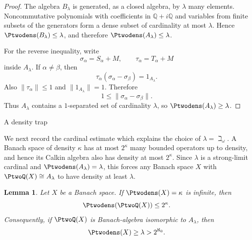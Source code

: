 \documentclass[11pt,reqno]{amsart}
\makeatletter
\theoremstyle{plain}
\newtheorem{lemma}[lemma]{Lemma}
\theoremstyle{definition}
\newcounter{problempaper}
\newenvironment{problempaperbody}{%
  \setcounter{subsection}{0}%
  \setcounter{subsubsection}{0}%
  \setcounter{paragraph}{0}%
  \renewcommand{\thesubsection}{\arabic{subsection}}%
  \renewcommand{\thesubsubsection}{\thesubsection.\arabic{subsubsection}}%
  \renewcommand{\theparagraph}{\thesubsubsection.\arabic{paragraph}}%
  \let\problem@outersection\section
  \let\problem@outersubsection\subsection
  \let\problem@outersubsubsection\subsubsection
  \let\problem@outerparagraph\paragraph
  \let\section\problem@papersection
  \let\subsection\problem@papersubsection
  \let\subsubsection\problem@papersubsubsection
}{%
  \let\section\problem@outersection
  \let\subsection\problem@outersubsection
  \let\subsubsection\problem@outersubsubsection
  \let\paragraph\problem@outerparagraph
}
\newcommand{\problem@target}[2]{%
  \hypertarget{problem-\theproblempaper-#1-#2}{}%
}
\newcommand{\problem@paperheading}[3]{%
  \par\bigskip
  \problem@target{#1}{#2}%
  \noindent{\large\bfseries #2.\quad #3\par}%
  \nobreak\smallskip
}
\newcommand{\problem@papersubheading}[3]{%
  \par\medskip
  \problem@target{#1}{#2}%
  \noindent{\normalsize\bfseries #2.\quad #3\par}%
  \nobreak\smallskip
}
\newcommand{\problem@papersubsubheading}[3]{%
  \par\smallskip
  \problem@target{#1}{#2}%
  \noindent{\normalsize\itshape #2.\quad #3.\ }%
}
\def\problem@papersection{%
  \@ifstar{\problem@papersectionstar}{\problem@papersectionnostar}%
}
\def\problem@papersectionstar#1{%
  \par\bigskip\noindent{\large\bfseries #1\par}\nobreak\smallskip
}
\def\problem@papersectionnostar#1{%
  \refstepcounter{subsection}%
  \setcounter{subsubsection}{0}%
  \setcounter{paragraph}{0}%
  \problem@paperheading{section}{\thesubsection}{#1}%
  \problem@writecontentsline{section}{\thesubsection}{#1}%
}
\def\problem@papersubsection{%
  \@ifstar{\problem@papersubsectionstar}{\problem@papersubsectionnostar}%
}
\def\problem@papersubsectionstar#1{%
  \par\medskip\noindent{\normalsize\bfseries #1\par}\nobreak\smallskip
}
\def\problem@papersubsectionnostar#1{%
  \refstepcounter{subsubsection}%
  \setcounter{paragraph}{0}%
  \problem@papersubheading{subsection}{\thesubsubsection}{#1}%
  \problem@writecontentsline{subsection}{\thesubsubsection}{#1}%
}
\def\problem@papersubsubsection{%
  \@ifstar{\problem@papersubsubsectionstar}{\problem@papersubsubsectionnostar}%
}
\def\problem@papersubsubsectionstar#1{%
  \par\smallskip\noindent{\normalsize\itshape #1.\ }%
}
\def\problem@papersubsubsectionnostar#1{%
  \refstepcounter{paragraph}%
  \problem@papersubsubheading{subsubsection}{\theparagraph}{#1}%
  \problem@writecontentsline{subsubsection}{\theparagraph}{#1}%
}
\newcommand{\problem@writecontentsline}[3]{%
  \begingroup
  \protected@write\@auxout{}{%
    \string\problemcontentsentry{\theproblempaper}{#1}{#2}{#3}{\thepage}%
  }%
  \endgroup
}
\newcommand{\problemcontentsentry}[5]{%
  \@ifundefined{problemcontents@#1}{%
    \expandafter\gdef\csname problemcontents@#1\endcsname{}%
  }{}%
  \expandafter\g@addto@macro\csname problemcontents@#1\endcsname{%
    \problemcontentsline{#1}{#2}{#3}{#4}{#5}%
  }%
}
\newcommand{\problemcontentslink}[4]{%
  \hyperlink{problem-#1-#2-#3}{#4}%
}
\newcommand{\problemcontentsline}[5]{%
  \ifstrequal{#2}{section}{%
    \par\noindent
    \problemcontentslink{#1}{#2}{#3}{\makebox[2.5em][l]{#3}#4}%
    \nobreak\dotfill
    \problemcontentslink{#1}{#2}{#3}{#5}\par
  }{%
    \ifstrequal{#2}{subsection}{%
      \par\noindent\hspace*{1.5em}%
      \problemcontentslink{#1}{#2}{#3}{\makebox[3.5em][l]{#3}#4}%
      \nobreak\dotfill
      \problemcontentslink{#1}{#2}{#3}{#5}\par
    }{%
      \par\noindent\hspace*{3em}%
      \problemcontentslink{#1}{#2}{#3}{\makebox[4.5em][l]{#3}#4}%
      \nobreak\dotfill
      \problemcontentslink{#1}{#2}{#3}{#5}\par
    }%
  }%
}
\makeatother
\begin{document}
\begin{problempaperbody}
\begin{proof}
The algebra $B_\lambda$ is generated, as a closed algebra, by $\lambda$ many elements. Noncommutative polynomials with coefficients in $\mathbb Q+i\mathbb Q$ and variables from finite subsets of the generators form a dense subset of cardinality at most $\lambda$. Hence $\Ptwodens(B_\lambda)\leq\lambda$, and therefore $\Ptwodens(A_\lambda)\leq\lambda$.

For the reverse inequality, write
\begin{equation*}
        \sigma_\alpha=S_\alpha+M,\qquad \tau_\alpha=T_\alpha+M
\end{equation*}
inside $A_\lambda$. If $\alpha\ne\beta$, then
\begin{equation*}
        \tau_\alpha(\sigma_\alpha-\sigma_\beta)=1_{A_\lambda}.
\end{equation*}
Also $\|\tau_\alpha\|\leq1$ and $\|1_{A_\lambda}\|=1$. Therefore
\begin{equation*}
        1\leq\|\sigma_\alpha-\sigma_\beta\|.
\end{equation*}
Thus $A_\lambda$ contains a $1$-separated set of cardinality $\lambda$, so $\Ptwodens(A_\lambda)\geq\lambda$.
\end{proof}

\subsection{A density trap}
\label{p2-second:sec:density-trap}

We next record the cardinal estimate which explains the choice of $\lambda=\beth_\omega$. A Banach space of density $\kappa$ has at most $2^\kappa$ many bounded operators up to density, and hence its Calkin algebra also has density at most $2^\kappa$. Since $\lambda$ is a strong-limit cardinal and $\Ptwodens(A_\lambda)=\lambda$, this forces any Banach space $X$ with $\PtwoQ(X)\cong A_\lambda$ to have density at least $\lambda$.

\begin{lemma}
\label{p2-second:lem:density-trap}
Let $X$ be a Banach space. If $\Ptwodens(X)=\kappa$ is infinite, then
\begin{equation*}
        \Ptwodens(\PtwoQ(X))\leq2^\kappa.
\end{equation*}
Consequently, if $\PtwoQ(X)$ is Banach-algebra isomorphic to $A_\lambda$, then
\begin{equation*}
        \Ptwodens(X)\geq\lambda>2^{\aleph_0}.
\end{equation*}
\end{lemma}


\end{problempaperbody}
\end{document}
